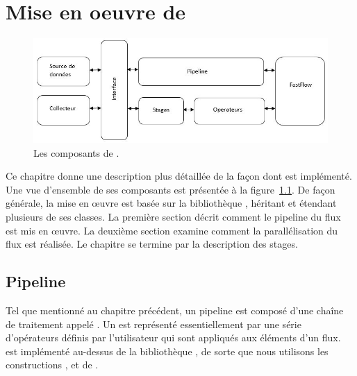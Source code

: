 
\chapter{Mise en oeuvre de \PpFf}
\label{implementation.chap}




\begin{figure}[ht]
\centering
     \includegraphics[width=1.0\textwidth]{Figures/AllComponentsAPI.jpg}
      \caption{Les composants de .}
       \label{AllComponentsAPI.fig}
\end{figure}


Ce chapitre donne une description plus d\'etaill\'ee de la fa\c{c}on dont  est impl\'ement\'e. Une vue d'ensemble de ses composants est pr\'esent\'ee à la figure~\ref{AllComponentsAPI.fig}. De fa\c{c}on g\'en\'erale, la mise en \oe{}uvre est bas\'ee sur la biblioth\`eque , h\'eritant et \'etendant plusieurs de ses classes.
La premi\`ere section d\'ecrit  comment le pipeline du flux est mis en œuvre. La deuxi\`eme section examine  comment la parall\'elisation du flux est r\'ealis\'ee. Le chapitre se termine par la description des stages.


\section{Pipeline}

Tel que mentionn\'e au chapitre pr\'ec\'edent, un pipeline est compos\'e d'une cha\^ine de traitement appel\'e . Un  est repr\'esent\'e essentiellement par une s\'erie d'op\'erateurs d\'efinis par l'utilisateur qui sont appliqu\'es aux \'el\'ements d'un flux.  est impl\'ement\'e au-dessus de la biblioth\`eque , de sorte que nous utilisons les constructions ,  et  de .


